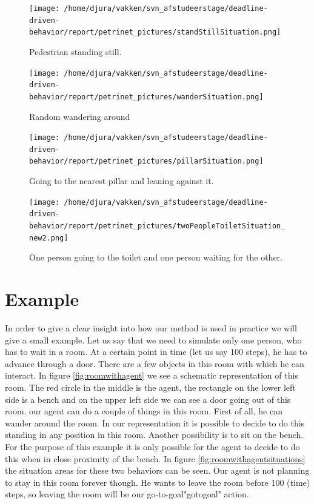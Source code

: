 \documentclass[11pt, a4paper]{book}
\begin{document}
\begin{figure}[h!]
\centering            
\texttt{[image: /home/djura/vakken/svn\_afstudeerstage/deadline-driven-behavior/report/petrinet\_pictures/standStillSituation.png]}
\caption{Pedestrian standing still.}
\label{fig:standstillpetrinet}
\end{figure}

\begin{figure}[h!]
\centering            
\texttt{[image: /home/djura/vakken/svn\_afstudeerstage/deadline-driven-behavior/report/petrinet\_pictures/wanderSituation.png]}
\caption{Random wandering around}
\label{fig:wanderpetrinet}
\end{figure}

\begin{figure}[[h!]
\centering            
\texttt{[image: /home/djura/vakken/svn\_afstudeerstage/deadline-driven-behavior/report/petrinet\_pictures/pillarSituation.png]}
\caption{Going to the nearest pillar and leaning against it.}
\label{fig:pillarpetrinet}
\end{figure}

\begin{figure}[h!]
\centering            
\texttt{[image: /home/djura/vakken/svn\_afstudeerstage/deadline-driven-behavior/report/petrinet\_pictures/twoPeopleToiletSituation\_new2.png]}
\caption{One person going to the toilet and one person waiting for the other.}
\label{fig:gototoiletpetrinet}
\end{figure}

\clearpage

\section{Example}
In order to give a clear insight into how our method is used in practice we will give a small example. Let us say that we need to simulate only one person, who has to wait in a room. At a certain point in time (let us say 100 steps), he has to advance through a door. There are a few objects in this room with which he can interact. In figure  \ref{fig:roomwithagent} we see a schematic representation of this room. The red circle in the middle is the agent, the rectangle on the lower left side is a bench and on the upper left side we can see a door going out of this room. our agent can do a couple of things in this room. First of all, he can wander around the room. In our representation it is possible to decide to do this standing in any position in this room. Another possibility is to sit on the bench. For the purpose of this example it is only possible for the agent to decide to do this when in close proximity of the bench. In figure \ref{fig:roomwithagentsituations} the situation areas for these two behaviors can be seen. Our agent is not planning to stay in this room forever though. He wants to leave the room before 100 (time) steps, so leaving the room will be our go-to-goal"gotogoal" action.
\end{document}
